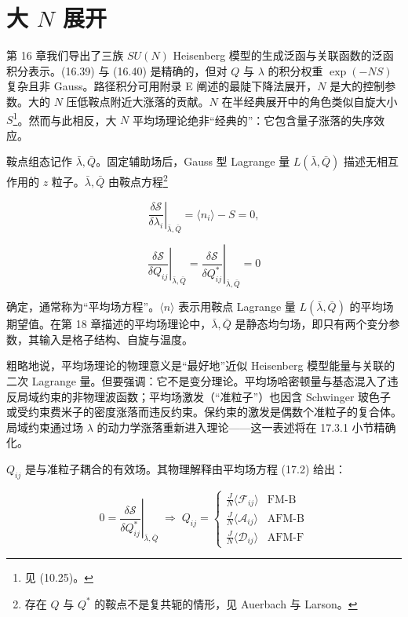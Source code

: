 \chapter{大 $N$ 展开}

第 16 章我们导出了三族 $SU(N)$ Heisenberg 模型的生成泛函与关联函数的泛函积分表示。(16.39) 与 (16.40) 是精确的，但对 $Q$ 与 $\lambda$ 的积分权重 $\exp(-NS)$ 复杂且非 Gauss。路径积分可用附录 E 阐述的最陡下降法展开，$N$ 是大的控制参数。大的 $N$ 压低鞍点附近大涨落的贡献。$N$ 在半经典展开中的角色类似自旋大小 $S$\footnote{见 (10.25)。}。然而与此相反，大 $N$ 平均场理论绝非“经典的”：它包含量子涨落的失序效应。

鞍点组态记作 $\bar{\lambda},\bar{Q}$。固定辅助场后，Gauss 型 Lagrange 量 $L(\bar{\lambda},\bar{Q})$ 描述无相互作用的 $z$ 粒子。$\bar{\lambda},\bar{Q}$ 由鞍点方程\footnote{存在 $Q$ 与 $Q^{*}$ 的鞍点不是复共轭的情形，见 Auerbach 与 Larson。}

\begin{equation*}
\left. \frac {\delta \mathcal {S}}{\delta \lambda_ {i}} \right| _ {\bar {\lambda}, \bar {Q}} = \langle n _ {i} \rangle - S = 0 ,
\tag{17.1}
\end{equation*}

\begin{equation*}
\left. \frac {\delta \mathcal {S}}{\delta Q _ {ij}} \right| _ {\bar {\lambda}, \bar {Q}} = \left. \frac {\delta \mathcal {S}}{\delta Q _ {ij} ^ {*}} \right| _ {\bar {\lambda}, \bar {Q}} = 0
\tag{17.2}
\end{equation*}

确定，通常称为“平均场方程”。$\langle n\rangle$ 表示用鞍点 Lagrange 量 $L(\bar{\lambda},\bar{Q})$ 的平均场期望值。在第 18 章描述的平均场理论中，$\bar{\lambda},\bar{Q}$ 是静态均匀场，即只有两个变分参数，其输入是格子结构、自旋与温度。

粗略地说，平均场理论的物理意义是“最好地”近似 Heisenberg 模型能量与关联的二次 Lagrange 量。但要强调：它不是变分理论。平均场哈密顿量与基态混入了违反局域约束的非物理波函数；平均场激发（“准粒子”）也因含 Schwinger 玻色子或受约束费米子的密度涨落而违反约束。保约束的激发是偶数个准粒子的复合体。局域约束通过场 $\lambda$ 的动力学涨落重新进入理论——这一表述将在 17.3.1 小节精确化。

$Q_{ij}$ 是与准粒子耦合的有效场。其物理解释由平均场方程 (17.2) 给出：

\begin{equation*}
0 = \left. \frac {\delta \mathcal {S}}{\delta Q _ {ij} ^ {*}} \right| _ {\bar {\lambda}, \bar {Q}} \; \Rightarrow \; Q _ {ij} = \left\{ \begin{array}{ll} \frac {J}{N} \langle \mathcal {F} _ {ij} \rangle & \text{FM-B} \\ \frac {J}{N} \langle \mathcal {A} _ {ij} \rangle & \text{AFM-B} \\ \frac {J}{N} \langle \mathcal {D} _ {ij} \rangle & \text{AFM-F} \end{array} \right.
\tag{17.3}
\end{equation*}

